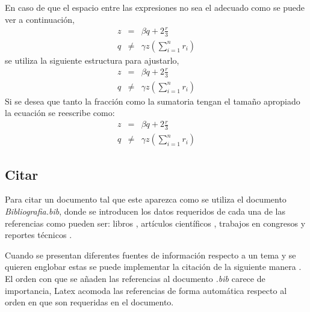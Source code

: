 \documentclass[11pt,onside]{article}
\begin{document}
En caso de que el espacio entre las expresiones no sea el adecuado como se puede ver a continuación,
\begin{equation}
    \begin{array}{rcl}
         z&=  & \beta q +2 \frac{r}{3} \\
         q&\neq  & \gamma z  \left( \sum_{i=1}^{n} r_{i} \right)
    \end{array}
\end{equation}
\noindent se utiliza la siguiente estructura para ajustarlo,
{
\begin{equation}
    \begin{array}{rcl}
         z&=  & \beta q +2 \frac{r}{3} \\
         q&\neq  & \gamma z  \left( \sum_{i=1}^{n} r_{i} \right)
    \end{array}
\end{equation}}
Si se desea que tanto la fracción como la sumatoria tengan el tamaño apropiado la ecuación se reescribe como:
{
\begin{equation}
    \begin{array}{rcl}
         z&=  & \beta q +2 \displaystyle\frac{r}{3} \\
         q&\neq  & \gamma z  \left( \displaystyle\sum_{i=1}^{n} r_{i} \right)
    \end{array}
\end{equation}}

\subsection{Citar}

Para citar un documento tal que este aparezca como \cite{watson53} se utiliza el documento \textit{Bibliografia.bib}, donde se introducen los datos requeridos de cada una de las referencias como pueden ser: libros \cite{proakis1988introduction}, artículos científicos \cite{xie2019experimental}, trabajos en congresos \cite{wang2020orthogonal} y reportes técnicos \cite{world2019medication}.

Cuando se presentan diferentes fuentes de información respecto a un tema y se quieren englobar estas se puede implementar la citación de la siguiente manera \cite{guckenheimer2002chaos,foster1993significance,wang2007analysis,shorten2000hodgkin}. El orden con que se añaden las referencias al documento \textit{.bib} carece de importancia, Latex acomoda las referencias de forma automática respecto al orden en que son requeridas en el documento.
\end{document}
